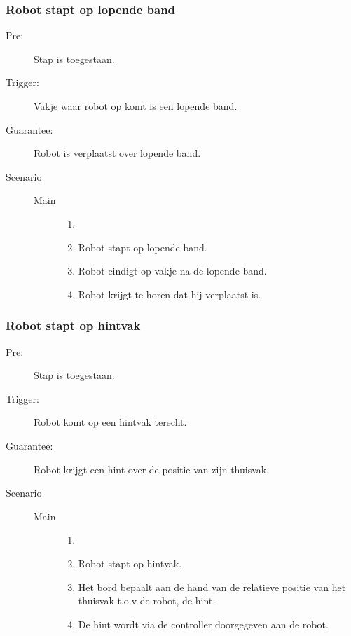 \subsubsection*{Robot stapt op lopende band}
\begin{description}
  \item[Pre:] Stap is toegestaan.
  \item[Trigger:] Vakje waar robot op komt is een lopende band.
  \item[Guarantee:] Robot is verplaatst over lopende band.
  \item[Scenario]
    \begin{description}
        \item[]
        \item[Main]
            \begin{enumerate}
              \item[]
              \item Robot stapt op lopende band.
              \item Robot eindigt op vakje na de lopende band.
              \item Robot krijgt te horen dat hij verplaatst is.
            \end{enumerate}
    \end{description}
\end{description}

\subsubsection*{Robot stapt op hintvak}
\begin{description}
  \item[Pre:] Stap is toegestaan.
  \item[Trigger:] Robot komt op een hintvak terecht.
  \item[Guarantee:] Robot krijgt een hint over de positie van zijn thuisvak.
  \item[Scenario]
    \begin{description}
        \item[]
        \item[Main]
            \begin{enumerate}
              \item[]
              \item Robot stapt op hintvak.
              \item Het bord bepaalt aan de hand van de relatieve positie van het thuisvak t.o.v de robot, de hint.
              \item De hint wordt via de controller doorgegeven aan de robot.
            \end{enumerate}
    \end{description}
\end{description}

